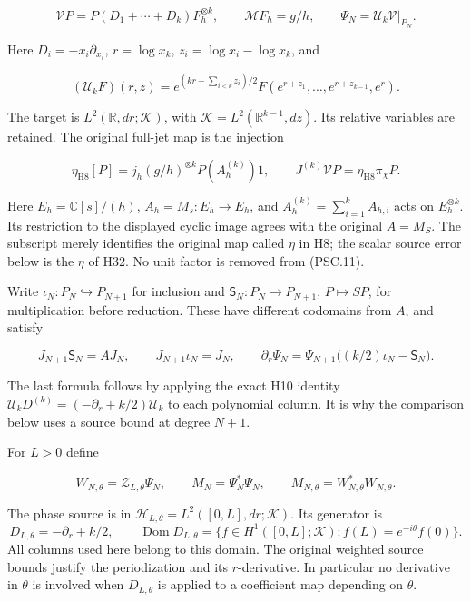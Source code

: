 \[
 \mathcal VP=P(D_1+\cdots+D_k)F_h^{\otimes k},
 \qquad \mathcal MF_h=g/h,\qquad
 \Psi_N=\mathcal U_k\mathcal V|_{P_N}.
 \tag{PSC.10}
\]

Here \(D_i=-x_i\partial_{x_i}\),
\(r=\log x_k\), \(z_i=\log x_i-\log x_k\), and

\[
 (\mathcal U_kF)(r,z)
 =e^{(kr+\sum_{i<k}z_i)/2}
 F(e^{r+z_1},\ldots,e^{r+z_{k-1}},e^r).
\]

The target is \(L^2(\mathbb R,dr;\mathcal K)\), with
\(\mathcal K=L^2(\mathbb R^{k-1},dz)\). Its relative variables are retained. The original full-jet map is the injection

\[
 \eta_{\mathrm{H8}}[P]
 =j_h(g/h)^{\otimes k}P(A_h^{(k)})1,\qquad
 J^{(k)}\mathcal VP=\eta_{\mathrm{H8}}\pi_\chi P.
 \tag{PSC.11}
\]

Here \(E_h=\mathbb C[s]/(h)\), \(A_h=M_s:E_h\to E_h\), and \(A_h^{(k)}=\sum_{i=1}^kA_{h,i}\) acts on \(E_h^{\otimes k}\). Its restriction to the displayed cyclic image agrees with the original \(A=M_S\). The subscript merely identifies the original map called \(\eta\) in H8; the scalar source error below is the \(\eta\) of H32. No unit factor is removed from (PSC.11).

Write \(\iota_N:P_N\hookrightarrow P_{N+1}\) for inclusion and
\(\mathsf S_N:P_N\to P_{N+1}\), \(P\mapsto SP\), for multiplication before reduction. These have different codomains from \(A\), and satisfy

\[
 J_{N+1}\mathsf S_N=AJ_N,\qquad
 J_{N+1}\iota_N=J_N,\qquad
 \partial_r\Psi_N
 =\Psi_{N+1}\bigl((k/2)\iota_N-\mathsf S_N\bigr).
 \tag{PSC.12}
\]

The last formula follows by applying the exact H10 identity
\(\mathcal U_kD^{(k)}=(-\partial_r+k/2)\mathcal U_k\) to each polynomial column. It is why the comparison below uses a source bound at degree \(N+1\).

For \(L>0\) define

\[
 W_{N,\theta}=\mathcal Z_{L,\theta}\Psi_N,\qquad
 M_N=\Psi_N^*\Psi_N,\qquad
 M_{N,\theta}=W_{N,\theta}^*W_{N,\theta}.
 \tag{PSC.13}
\]

The phase source is in
\(\mathcal H_{L,\theta}=L^2([0,L],dr;\mathcal K)\).
Its generator is
\[
 D_{L,\theta}=-\partial_r+k/2,\qquad
 \operatorname{Dom}D_{L,\theta}
 =\{f\in H^1([0,L];\mathcal K):f(L)=e^{-i\theta}f(0)\}.
\]
All columns used here belong to this domain. The original weighted source bounds justify the periodization and its \(r\)-derivative. In particular no derivative in \(\theta\) is involved when \(D_{L,\theta}\) is applied to a coefficient map depending on \(\theta\).

